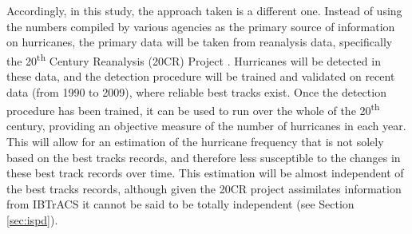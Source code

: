 \documentclass[pdftex,12pt,a4paper]{report}
\newcommand{\ts}{\textsuperscript}
\begin{document}
Accordingly, in this study, the approach taken is a different one. Instead of using the numbers
compiled by various agencies as the primary source of information on hurricanes, the primary data
will be taken from reanalysis data, specifically the 20\ts{th} Century Reanalysis (20CR) Project
\parencite{compoTwentieth2011}. Hurricanes will be detected in these data, and the detection
procedure will be trained and validated on recent data (from 1990 to 2009), where reliable best
tracks exist. Once the detection procedure has been trained, it can be used to run over the whole of
the 20\ts{th} century, providing an objective measure of the number of hurricanes in each year. This
will allow for an estimation of the hurricane frequency that is not solely based on the best tracks
records, and therefore less susceptible to the changes in these best track records over time. This
estimation will be almost independent of the best tracks records, although given the 20CR project
assimilates information from IBTrACS it cannot be said to be totally independent (see Section
\ref{sec:ispd}).



\end{document}
